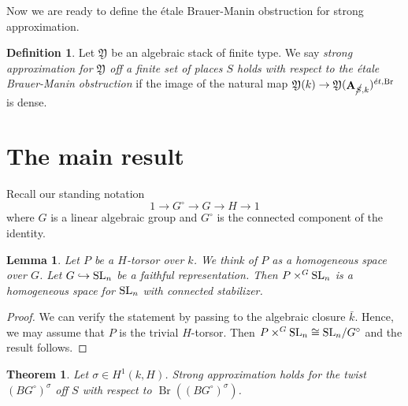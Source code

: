 \documentclass[12pt, final]{amsart}
\theoremstyle{remark}
\theoremstyle{definition}
\newtheorem{definition}[example]{Definition}
\theoremstyle{plain}
\newtheorem{theorem}[example]{Theorem}
\newtheorem{lemma}[example]{Lemma}
\newcommand{\fY}{{\mathfrak Y}}
\renewcommand{\sl}{{\rm SL}}
\newcommand{\et}{{\acute{e}t}}
\DeclareMathOperator{\bA}{{\bf A}}
\newcommand{\cS}{\cancel{S}}
\DeclareMathOperator{\Br}{Br}
\begin{document}
Now we are ready to define the \'etale Brauer-Manin obstruction for strong approximation.

\begin{definition}\label{def:ebm-obstruction-off-S}
    Let $\fY$ be an algebraic stack of finite type. We say 
    \emph{strong approximation for $\fY$ off a finite set of places $S$ holds with respect to the \'etale Brauer-Manin obstruction} 
    if the image of the natural map $\fY(k) \to \fY(\bA_{\cS,k})^{\et, \Br}$ is dense.    
\end{definition}

\section{The main result}\label{sec:maintheorem}

Recall our standing notation 
$$
1\to G^{\circ}\to G \to H \to 1
$$
where $G$ is a linear algebraic group and $G^{\circ}$
is the connected component of the identity. 

\begin{lemma}
    \label{l:homogeneous}
    Let $P$ be a $H$-torsor over $k$. We think of $P$ as a homogeneous space over $G$. Let $G\hookrightarrow \sl_n$ be a faithful representation. 
    Then $P\times^{G}\sl_{n}$ is a homogeneous space for $\sl_n$ with connected stabilizer. 
\end{lemma}

\begin{proof}
    We can verify the statement by passing to the algebraic closure $\bar{k}$. Hence, we may assume that $P$ is the trivial $H$-torsor. Then $P\times^{G}\sl_{n} \cong \sl_{n}/G^{\circ}$ and the result follows. 
\end{proof}

\begin{theorem}\label{theorem:strong-app-twist}
     Let $\sigma \in H^1(k, H)$. Strong approximation holds for the twist $(BG^{\circ})^{\sigma}$ off $S$ with respect to $\Br((BG^{\circ})^{\sigma})$. 
\end{theorem}
\end{document}
